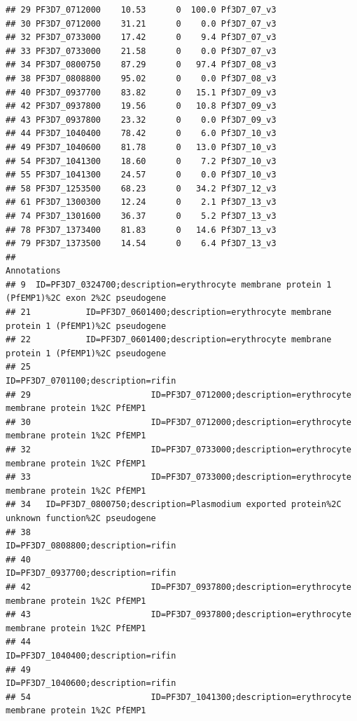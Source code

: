 \documentclass[12pt, a4paper]{article}\usepackage[]{graphicx}\usepackage[]{color}
\makeatletter
\newenvironment{kframe}{%
 \def\at@end@of@kframe{}%
 \ifinner\ifhmode%
  \def\at@end@of@kframe{\end{minipage}}%
  \begin{minipage}{\columnwidth}%
 \fi\fi%
 \def\FrameCommand##1{\hskip\@totalleftmargin \hskip-\fboxsep
 \colorbox{shadecolor}{##1}\hskip-\fboxsep
     \hskip-\linewidth \hskip-\@totalleftmargin \hskip\columnwidth}%
 \MakeFramed {\advance\hsize-\width
   \@totalleftmargin\z@ \linewidth\hsize
   \@setminipage}}%
 {\par\unskip\endMakeFramed%
 \at@end@of@kframe}
\newenvironment{knitrout}{}{} %
\makeatother
\begin{document}
\begin{knitrout}
\begin{kframe}
\begin{verbatim}
## 29 PF3D7_0712000    10.53      0  100.0 Pf3D7_07_v3
## 30 PF3D7_0712000    31.21      0    0.0 Pf3D7_07_v3
## 32 PF3D7_0733000    17.42      0    9.4 Pf3D7_07_v3
## 33 PF3D7_0733000    21.58      0    0.0 Pf3D7_07_v3
## 34 PF3D7_0800750    87.29      0   97.4 Pf3D7_08_v3
## 38 PF3D7_0808800    95.02      0    0.0 Pf3D7_08_v3
## 40 PF3D7_0937700    83.82      0   15.1 Pf3D7_09_v3
## 42 PF3D7_0937800    19.56      0   10.8 Pf3D7_09_v3
## 43 PF3D7_0937800    23.32      0    0.0 Pf3D7_09_v3
## 44 PF3D7_1040400    78.42      0    6.0 Pf3D7_10_v3
## 49 PF3D7_1040600    81.78      0   13.0 Pf3D7_10_v3
## 54 PF3D7_1041300    18.60      0    7.2 Pf3D7_10_v3
## 55 PF3D7_1041300    24.57      0    0.0 Pf3D7_10_v3
## 58 PF3D7_1253500    68.23      0   34.2 Pf3D7_12_v3
## 61 PF3D7_1300300    12.24      0    2.1 Pf3D7_13_v3
## 74 PF3D7_1301600    36.37      0    5.2 Pf3D7_13_v3
## 78 PF3D7_1373400    81.83      0   14.6 Pf3D7_13_v3
## 79 PF3D7_1373500    14.54      0    6.4 Pf3D7_13_v3
##                                                                                     Annotations
## 9  ID=PF3D7_0324700;description=erythrocyte membrane protein 1 (PfEMP1)%2C exon 2%2C pseudogene
## 21           ID=PF3D7_0601400;description=erythrocyte membrane protein 1 (PfEMP1)%2C pseudogene
## 22           ID=PF3D7_0601400;description=erythrocyte membrane protein 1 (PfEMP1)%2C pseudogene
## 25                                                           ID=PF3D7_0701100;description=rifin
## 29                        ID=PF3D7_0712000;description=erythrocyte membrane protein 1%2C PfEMP1
## 30                        ID=PF3D7_0712000;description=erythrocyte membrane protein 1%2C PfEMP1
## 32                        ID=PF3D7_0733000;description=erythrocyte membrane protein 1%2C PfEMP1
## 33                        ID=PF3D7_0733000;description=erythrocyte membrane protein 1%2C PfEMP1
## 34   ID=PF3D7_0800750;description=Plasmodium exported protein%2C unknown function%2C pseudogene
## 38                                                           ID=PF3D7_0808800;description=rifin
## 40                                                           ID=PF3D7_0937700;description=rifin
## 42                        ID=PF3D7_0937800;description=erythrocyte membrane protein 1%2C PfEMP1
## 43                        ID=PF3D7_0937800;description=erythrocyte membrane protein 1%2C PfEMP1
## 44                                                           ID=PF3D7_1040400;description=rifin
## 49                                                           ID=PF3D7_1040600;description=rifin
## 54                        ID=PF3D7_1041300;description=erythrocyte membrane protein 1%2C PfEMP1

\end{verbatim}
\end{kframe}
\end{knitrout}
\end{document}
